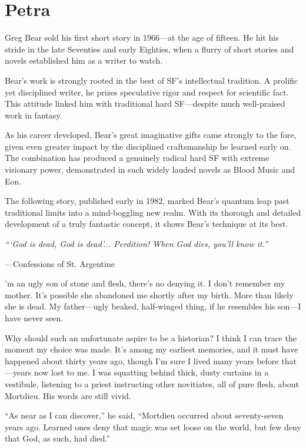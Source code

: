 \chapter{Petra}

Greg Bear sold his first short story in 1966—at the age of fifteen. He hit his stride in the late Seventies and early Eighties, when a flurry of short stories and novels established him as a writer to watch.

Bear's work is strongly rooted in the best of SF's intellectual tradition. A prolific yet disciplined writer, he prizes speculative rigor and respect for scientific fact. This attitude linked him with traditional hard SF—despite much well-praised work in fantasy.

As his career developed, Bear's great imaginative gifts came strongly to the fore, given even greater impact by the disciplined craftsmanship he learned early on. The combination has produced a genuinely radical hard SF with extreme visionary power, demonstrated in such widely lauded novels as Blood Music and Eon.

The following story, published early in 1982, marked Bear's quantum leap past traditional limits into a mind-boggling new realm. With its thorough and detailed development of a truly fantastic concept, it shows Bear's technique at its best.

\textit{```God is dead, God is dead'... Perdition! When God dies, you'll know it.''}

—Confessions of St. Argentine

\hrulefill

'm an ugly son of stone and flesh, there's no denying it. I don't remember my mother. It's possible she abandoned me shortly after my birth. More than likely she is dead. My father—ugly beaked, half-winged thing, if he resembles his son—I have never seen.

Why should such an unfortunate aspire to be a historian? I think I can trace the moment my choice was made. It's among my earliest memories, and it must have happened about thirty years ago, though I'm sure I lived many years before that—years now lost to me. I was squatting behind thick, dusty curtains in a vestibule, listening to a priest instructing other novitiates, all of pure flesh, about Mortdieu. His words are still vivid.

``As near as I can discover,'' he said, ``Mortdieu occurred about seventy-seven years ago. Learned ones deny that magic was set loose on the world, but few deny that God, as such, had died.''

